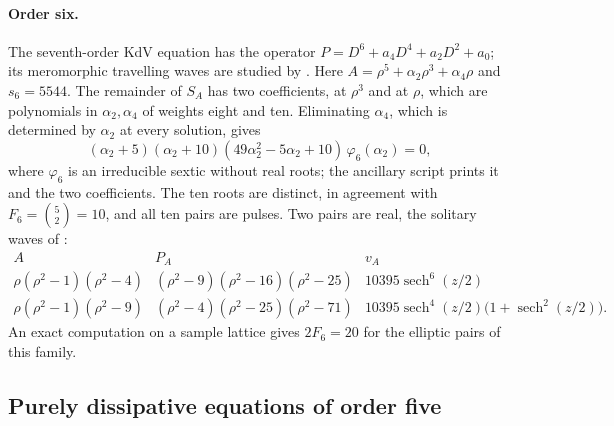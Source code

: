 \paragraph{Order six.}
The seventh-order KdV equation has the operator
\(P=D^6+a_4D^4+a_2D^2+a_0\); its meromorphic travelling waves are
studied by \citet{Dang2023Even}.
Here \(A=\rho^5+\alpha_2\rho^3+\alpha_4\rho\) and \(s_6=5544\). The
remainder of \(S_A\) has two coefficients, at \(\rho^3\) and at
\(\rho\), which are polynomials in \(\alpha_2,\alpha_4\) of weights
eight and ten. Eliminating \(\alpha_4\), which is determined by
\(\alpha_2\) at every solution, gives
\begin{equation}\label{eq:p6-eliminant}
 (\alpha_2+5)(\alpha_2+10)(49\alpha_2^2-5\alpha_2+10)\,
 \varphi_6(\alpha_2)=0,
\end{equation}
where \(\varphi_6\) is an irreducible sextic without real roots; the
ancillary script prints it and the two coefficients. The ten roots are
distinct, in agreement with \(F_6=\binom52=10\), and all ten pairs are
pulses. Two pairs are real, the solitary waves of
\citet{RyabovSinelshchikovKochanov2011}:
\begin{equation}\label{eq:p6-real}
 \begin{array}{c|c|c}
 A&P_A&v_A\\ \hline
 \rho(\rho^2-1)(\rho^2-4)&(\rho^2-9)(\rho^2-16)(\rho^2-25)
   &10395\operatorname{sech}^6(z/2)\\
 \rho(\rho^2-1)(\rho^2-9)&(\rho^2-4)(\rho^2-25)(\rho^2-71)
   &10395\operatorname{sech}^4(z/2)\bigl(1+\operatorname{sech}^2(z/2)\bigr).
 \end{array}
\end{equation}
An exact computation on a sample lattice gives \(2F_6=20\) for the
elliptic pairs of this family.

\subsection{Purely dissipative equations of order five}\label{sec:p5}

